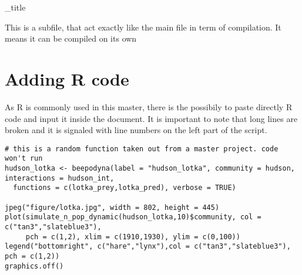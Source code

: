 \documentclass[../Master_report.tex]{subfiles}
\begin{document}
\sub_title{}

This is a subfile, that act exactly like the main file in term of compilation. It means it can be compiled on its own

\section{Adding R code}

As R \citep{RTeam2017} is commonly used in this master, there is the possibily to paste directly R code and input it inside the document. It is important to note that long lines are broken and it is signaled with line numbers on the left part of the script.

\begin{lstlisting}
# this is a random function taken out from a master project. code won't run
hudson_lotka <- beepodyna(label = "hudson_lotka", community = hudson, interactions = hudson_int,
  functions = c(lotka_prey,lotka_pred), verbose = TRUE)

jpeg("figure/lotka.jpg", width = 802, height = 445)
plot(simulate_n_pop_dynamic(hudson_lotka,10)$community, col = c("tan3","slateblue3"),
     pch = c(1,2), xlim = c(1910,1930), ylim = c(0,100))
legend("bottomright", c("hare","lynx"),col = c("tan3","slateblue3"), pch = c(1,2))
graphics.off()
\end{lstlisting}

\nocite{RTeam2017}

\biblio
\end{document}
